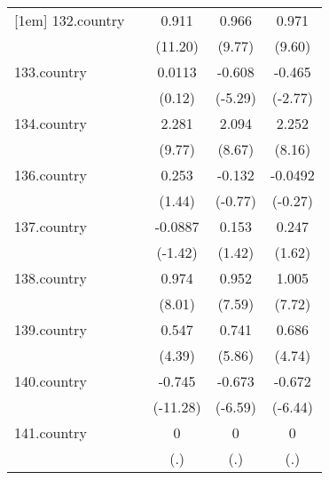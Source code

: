 {\begin{tabular}{l*{4}{c}}
[1em]
132.country &                     &       0.911\sym{***}&       0.966\sym{***}&       0.971\sym{***}\\
            &                     &     (11.20)         &      (9.77)         &      (9.60)         \\
[1em]
133.country &                     &      0.0113         &      -0.608\sym{***}&      -0.465\sym{**} \\
            &                     &      (0.12)         &     (-5.29)         &     (-2.77)         \\
[1em]
134.country &                     &       2.281\sym{***}&       2.094\sym{***}&       2.252\sym{***}\\
            &                     &      (9.77)         &      (8.67)         &      (8.16)         \\
[1em]
136.country &                     &       0.253         &      -0.132         &     -0.0492         \\
            &                     &      (1.44)         &     (-0.77)         &     (-0.27)         \\
[1em]
137.country &                     &     -0.0887         &       0.153         &       0.247         \\
            &                     &     (-1.42)         &      (1.42)         &      (1.62)         \\
[1em]
138.country &                     &       0.974\sym{***}&       0.952\sym{***}&       1.005\sym{***}\\
            &                     &      (8.01)         &      (7.59)         &      (7.72)         \\
[1em]
139.country &                     &       0.547\sym{***}&       0.741\sym{***}&       0.686\sym{***}\\
            &                     &      (4.39)         &      (5.86)         &      (4.74)         \\
[1em]
140.country &                     &      -0.745\sym{***}&      -0.673\sym{***}&      -0.672\sym{***}\\
            &                     &    (-11.28)         &     (-6.59)         &     (-6.44)         \\
[1em]
141.country &                     &           0         &           0         &           0         \\
            &                     &         (.)         &         (.)         &         (.)         \\

\end{tabular}}
